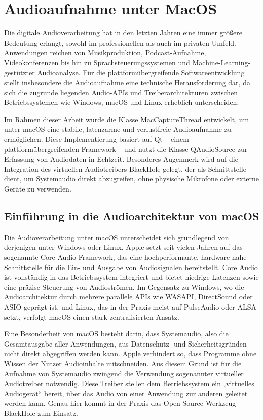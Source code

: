 \chapter{Audioaufnahme unter MacOS}
\label{chap:audio_mac}

Die digitale Audioverarbeitung hat in den letzten Jahren eine immer größere Bedeutung erlangt, sowohl im professionellen als auch im privaten Umfeld. Anwendungen reichen von Musikproduktion, Podcast-Aufnahme, Videokonferenzen bis hin zu Sprachsteuerungssystemen und Machine-Learning-gestützter Audioanalyse.
Für die plattformübergreifende Softwareentwicklung stellt insbesondere die Audioaufnahme eine technische Herausforderung dar, da sich die zugrunde liegenden Audio-APIs und Treiberarchitekturen zwischen Betriebssystemen wie Windows, macOS und Linux erheblich unterscheiden.

Im Rahmen dieser Arbeit wurde die Klasse MacCaptureThread entwickelt, um unter macOS eine stabile, latenzarme und verlustfreie Audioaufnahme zu ermöglichen. Diese Implementierung basiert auf Qt – einem plattformübergreifenden Framework – und nutzt die Klasse QAudioSource zur Erfassung von Audiodaten in Echtzeit.
Besonderes Augenmerk wird auf die Integration des virtuellen Audiotreibers BlackHole gelegt, der als Schnittstelle dient, um Systemaudio direkt abzugreifen, ohne physische Mikrofone oder externe Geräte zu verwenden.


\section{Einführung in die Audioarchitektur von macOS}

Die Audioverarbeitung unter macOS unterscheidet sich grundlegend von derjenigen unter Windows oder Linux. Apple setzt seit vielen Jahren auf das sogenannte Core Audio Framework, das eine hochperformante, hardware-nahe Schnittstelle für die Ein- und Ausgabe von Audiosignalen bereitstellt. Core Audio ist vollständig in das Betriebssystem integriert und bietet niedrige Latenzen sowie eine präzise Steuerung von Audioströmen. Im Gegensatz zu Windows, wo die Audioarchitektur durch mehrere parallele APIs wie WASAPI, DirectSound oder ASIO geprägt ist, und Linux, das in der Praxis meist auf PulseAudio oder ALSA setzt, verfolgt macOS einen stark zentralisierten Ansatz.

Eine Besonderheit von macOS besteht darin, dass Systemaudio, also die Gesamtausgabe aller Anwendungen, aus Datenschutz- und Sicherheitsgründen nicht direkt abgegriffen werden kann. Apple verhindert so, dass Programme ohne Wissen der Nutzer Audioinhalte mitschneiden. Aus diesem Grund ist für die Aufnahme von Systemaudio zwingend die Verwendung sogenannter virtueller Audiotreiber notwendig. Diese Treiber stellen dem Betriebssystem ein „virtuelles Audiogerät“ bereit, über das Audio von einer Anwendung zur anderen geleitet werden kann. Genau hier kommt in der Praxis das Open-Source-Werkzeug BlackHole zum Einsatz.


